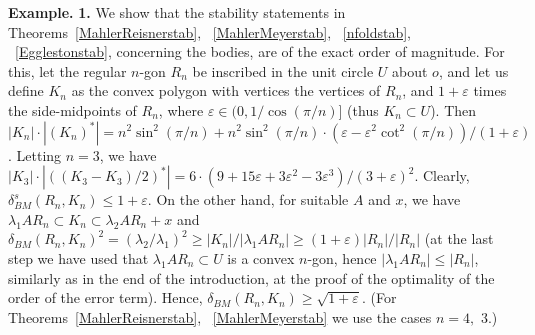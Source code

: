 \documentclass[12pt]{article}
\begin{document}

{\bf Example.} {\bf{1.}}
We show that the stability statements in  
Theorems~\ref{MahlerReisnerstab}, ~\ref{MahlerMeyerstab}, 
~\ref{nfoldstab}, ~\ref{Egglestonstab}, concerning the bodies, 
are of the exact order of magnitude. For this, let
the regular $n$-gon $R_n$ be inscribed in the unit circle $U$ about $o$, 
and let
us define $K_n$ as the convex polygon with vertices the vertices of $R_n$, and
$1+ \varepsilon $ times the side-midpoints of $R_n$, where $\varepsilon \in
(0, 1/ \cos ( \pi /n)]$ (thus $K_n \subset U$). 
Then $|K_n| \cdot |(K_n)^*|=n^2 \sin ^2 ( \pi /n) + n^2 \sin ^2 ( \pi /n)
\cdot \left( \varepsilon -\varepsilon ^2 \cot ^2 ( \pi /n) \right)/(1+
\varepsilon )$. Letting $n=3$, we have $|K_3| \cdot | \left( (K_3-K_3)/2
\right) ^*| = 6 \cdot (9+15 \varepsilon + 3 \varepsilon ^2 - 3 \varepsilon ^3)
/(3+ \varepsilon )^2$.
Clearly, $\delta _{BM}^s(R_n,K_n) \le 1+ \varepsilon
$. On the other hand, for suitable $A$ and $x$, we have 
$ \lambda _1 AR_n \subset K_n \subset \lambda _2 AR_n +x $ and
$\delta _{BM}(R_n,K_n)^2=( \lambda _2 / \lambda _1 )^2 \ge |K_n|/|\lambda _1
AR_n| \ge (1 + \varepsilon ) |R_n|/|R_n|$ (at the last step we have used that 
$ \lambda _1 AR_n \subset U$ is a convex $n$-gon, hence $|\lambda _1 AR_n| \le
|R_n|$, similarly as in the end of the introduction, at the proof of the
optimality of the order of the error term). 
Hence, $\delta _{BM}(R_n,K_n) \ge {\sqrt{1+ \varepsilon }} $. (For
Theorems~\ref{MahlerReisnerstab}, ~\ref{MahlerMeyerstab} we use the cases
$n=4,\,\,3$.) 
\end{document}
